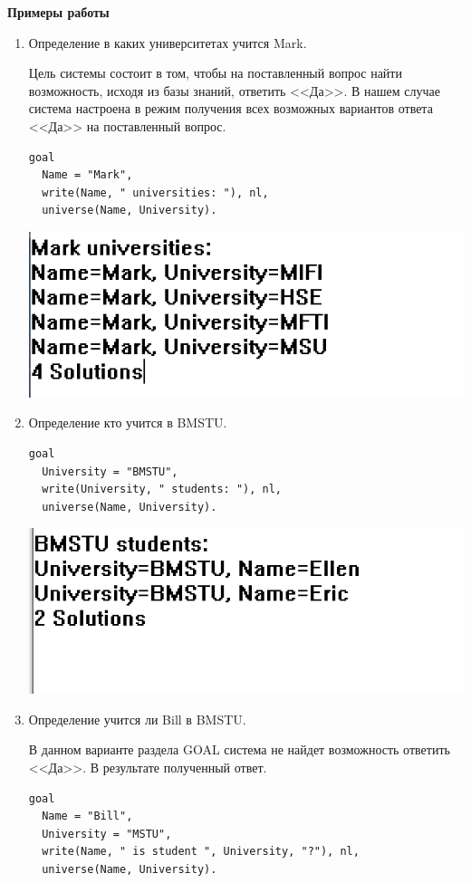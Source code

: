 \documentclass[a4paper,14pt]{extreport} %
\begin{document}
\textbf{Примеры работы}

\begin{enumerate}
\item Определение в каких университетах учится Mark. 

Цель системы состоит в том, чтобы на поставленный вопрос найти возможность, исходя из базы знаний, ответить <<Да>>. В нашем случае система настроена в режим получения всех возможных вариантов ответа <<Да>> на поставленный вопрос.

\begin{lstlisting}
goal
  Name = "Mark",
  write(Name, " universities: "), nl,
  universe(Name, University).
\end{lstlisting}

\includegraphics{ex1}

\item Определение кто учится в BMSTU. 

\begin{lstlisting}
goal
  University = "BMSTU",
  write(University, " students: "), nl,
  universe(Name, University).
\end{lstlisting}

\includegraphics{ex2}

\item Определение учится ли Bill в BMSTU. 

В данном варианте раздела GOAL система не найдет возможность ответить <<Да>>. В результате полученный ответ. 

\begin{lstlisting}
goal
  Name = "Bill",
  University = "MSTU",
  write(Name, " is student ", University, "?"), nl,
  universe(Name, University).
\end{lstlisting}


\end{enumerate}
\end{document}
